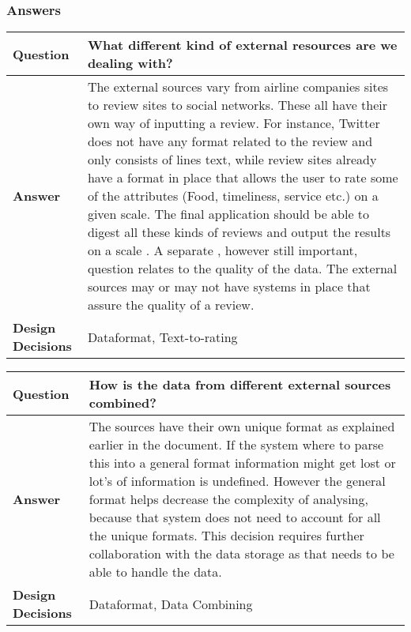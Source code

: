 \subsubsection{Answers}
\begin{longtable}{| l |  p{12cm} |}
\hline
\textbf{Question} & \textbf{What different kind of external resources are we dealing with?}  \\ \hline
\textbf{Answer} &
	The external sources vary from airline companies sites to review sites to social networks. These all have their own way of inputting a review. For instance, Twitter does not have any format related to the review and only consists of lines text, while review sites already have  a format in place that allows the user to rate some of the attributes (Food, timeliness, service etc.) on a given scale. The final application should be able to digest all these kinds of reviews and output the results on a scale . 
A separate , however still important, question relates to the quality of the data. The external sources may or may not have systems in place that assure the quality of a review. 
 \\ \hline
\textbf{Design Decisions} & Dataformat, Text-to-rating \\ \hline
\end{longtable}

\begin{longtable}{| l |  p{12cm} |}
\hline
\textbf{Question} & \textbf{How is the data from different external sources combined?}  \\ \hline
\textbf{Answer} &
	The sources have their own unique format as explained earlier in the document. If the system where to parse this into a general format information might get lost or lot's of information is undefined.
However the general format helps decrease the complexity of analysing, because that system does not need to account for all the unique formats. This decision requires further collaboration with the data storage
as that needs to be able to handle the data.  \\ \hline
\textbf{Design Decisions} & Dataformat, Data Combining \\ \hline
\end{longtable}

